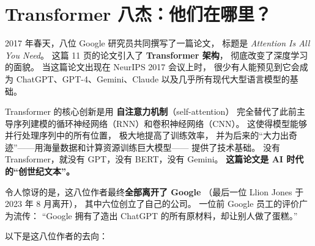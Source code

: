 \section{Transformer 八杰：他们在哪里？}
\label{sec:transformer-eight}

2017 年春天，八位 Google 研究员共同撰写了一篇论文，
标题是 \textit{Attention Is All You Need}。
这篇 11 页的论文引入了 \textbf{Transformer 架构}，
彻底改变了深度学习的面貌。
当这篇论文出现在 NeurIPS 2017 会议上时，
很少有人能预见到它会成为 ChatGPT、GPT-4、Gemini、Claude
以及几乎所有现代大型语言模型的基础。

\begin{whybox}[一篇论文如何催生了万亿美元的产业？]
Transformer 的核心创新是用 \textbf{自注意力机制}（self-attention）
完全替代了此前主导序列建模的循环神经网络（RNN）和卷积神经网络（CNN）。
这使得模型能够并行处理序列中的所有位置，
极大地提高了训练效率，
并为后来的``大力出奇迹''——用海量数据和计算资源训练巨大模型——
提供了技术基础。
没有 Transformer，就没有 GPT，没有 BERT，没有 Gemini。
\textbf{这篇论文是 AI 时代的``创世纪文本''。}
\end{whybox}

令人惊讶的是，这八位作者最终\textbf{全部离开了 Google}
（最后一位 Llion Jones 于 2023 年 8 月离开），
其中六位创立了自己的公司。
一位前 Google 员工的评价广为流传：
``Google 拥有了造出 ChatGPT 的所有原材料，却让别人做了蛋糕。''

以下是这八位作者的去向：

